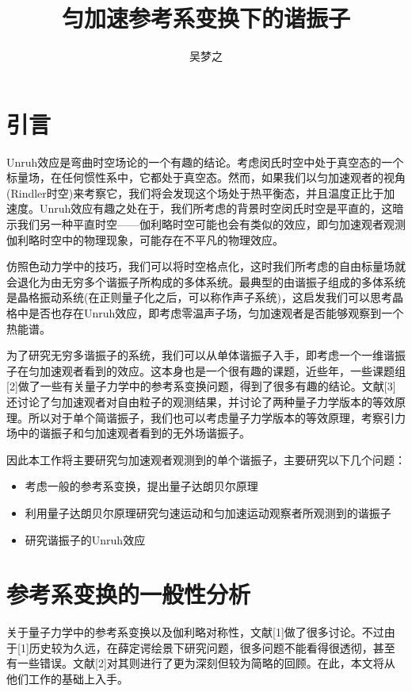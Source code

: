 \documentclass[a4paper]{article}
\title{匀加速参考系变换下的谐振子}
\author{吴梦之}
\begin{document}
    \maketitle
    \section{引言}
        Unruh效应是弯曲时空场论的一个有趣的结论。考虑闵氏时空中处于真空态的一个标量场，在任何惯性系中，它都处于真空态。然而，如果我们以匀加速观者的视角(Rindler时空)来考察它，我们将会发现这个场处于热平衡态，并且温度正比于加速度。Unruh效应有趣之处在于，我们所考虑的背景时空闵氏时空是平直的，这暗示我们另一种平直时空——伽利略时空可能也会有类似的效应，即匀加速观者观测伽利略时空中的物理现象，可能存在不平凡的物理效应。

        仿照色动力学中的技巧，我们可以将时空格点化，这时我们所考虑的自由标量场就会退化为由无穷多个谐振子所构成的多体系统。最典型的由谐振子组成的多体系统是晶格振动系统(在正则量子化之后，可以称作声子系统)，这启发我们可以思考晶格中是否也存在Unruh效应，即考虑零温声子场，匀加速观者是否能够观察到一个热能谱。

        为了研究无穷多谐振子的系统，我们可以从单体谐振子入手，即考虑一个一维谐振子在匀加速观者看到的效应。这本身也是一个很有趣的课题，近些年，一些课题组[2]做了一些有关量子力学中的参考系变换问题，得到了很多有趣的结论。文献[3]还讨论了匀加速观者对自由粒子的观测结果，并讨论了两种量子力学版本的等效原理。所以对于单个简谐振子，我们也可以考虑量子力学版本的等效原理，考察引力场中的谐振子和匀加速观者看到的无外场谐振子。

        因此本工作将主要研究匀加速观者观测到的单个谐振子，主要研究以下几个问题：
        \begin{itemize}
            \item 考虑一般的参考系变换，提出量子达朗贝尔原理
            \item 利用量子达朗贝尔原理研究匀速运动和匀加速运动观察者所观测到的谐振子
            \item 研究谐振子的Unruh效应
        \end{itemize}


    \section{参考系变换的一般性分析}
        关于量子力学中的参考系变换以及伽利略对称性，文献[1]做了很多讨论。不过由于[1]历史较为久远，在薛定谔绘景下研究问题，很多问题不能看得很透彻，甚至有一些错误。文献[2]对其则进行了更为深刻但较为简略的回顾。在此，本文将从他们工作的基础上入手。
\end{document}
